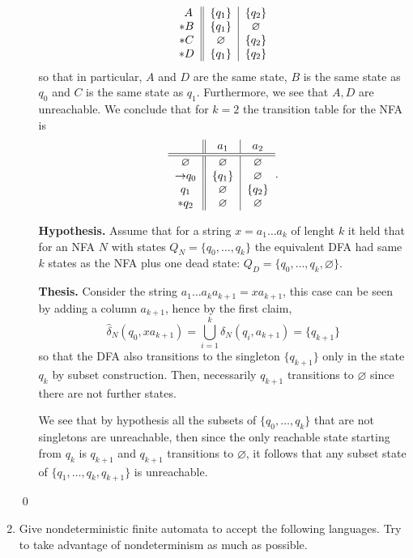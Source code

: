 \documentclass{article}
\newcommand{\NN}[2]{
    \hat{\delta}_{N}(#1, #2)
}
\theoremstyle{remark}
\begin{document}
\begin{enumerate}
\begin{enumerate}
\[\begin{tabular}{c||c|c}
$$                $A$ & $\{q_1\}$ & $\{q_2\}$\\
                $*B$ & $\{q_1\}$ & $\varnothing$\\
                $*C$ & $\varnothing$ & $\{q_2\}$\\
                $*D$ & $\{q_1\}$ & $\{q_2\}$
            \end{tabular}
        \]
        so that in particular, $A$ and $D$ are the same state, $B$ is the same state as $q_0$ and $C$ is the same state as $q_1$.
        Furthermore, we see that $A, D$ are unreachable. 
        We conclude that for $k = 2$ the transition table for the NFA is
        \[
            \begin{tabular}{c||c|c}
                & $a_1$ & $a_2$\\
                \hline\hline
                $\varnothing$ & $\varnothing$ & $\varnothing$\\
                $\rightarrow$$q_0$ & $\{q_1\}$ & $\varnothing$\\
                $q_1$ & $\varnothing$ & $\{q_2\}$ \\
                $*q_2$ & $\varnothing$ & $\varnothing$  
            \end{tabular}.
        \]

        \item[\textbf{Hypothesis.}]
        Assume that for a string $x = a_1\dots a_{k}$ of lenght $k$ it held that for an NFA $N$ with states $Q_N = \{q_0,\dots, q_k\}$ the equivalent DFA
        had same $k$ states as the NFA plus one dead state: $Q_D = \{q_0,\dots, q_k, \varnothing\}$.

        \item[\textbf{Thesis.}]
        Consider the string $a_1\dots a_k a_{k+1} = xa_{k+1}$, 
        this case can be seen by adding a column $a_{k+1}$, hence
        by the first claim,
        \[
        \NN{q_0}{xa_{k+1}} = \bigcup_{i=1}^{k}\delta_N(q_i,a_{k+1}) = \{q_{k+1}\}
        \]
        so that the DFA also transitions to the singleton $\{q_{k+1}\}$ only in the state $q_k$ by subset construction.
        Then, necessarily $q_{k+1}$ transitions to $\varnothing$ since there are not further states.

        We see that by hypothesis all the subsets of $\{q_0,\dots,q_k\}$
        that are not singletons are unreachable, then since the only 
        reachable state starting from $q_{k}$ is $q_{k+1}$ and $q_{k+1}$ transitions to $\varnothing$,
        it follows that any subset state of $\{q_1,\dots, q_{k},q_{k+1}\}$ is unreachable.
    \end{enumerate}
    \begin{flushright}
        \qed
    \end{flushright}
    \item Give nondeterministic finite automata to accept the following languages. Try to take advantage of nondeterminism as much as possible.


\end{enumerate}
\end{document}
